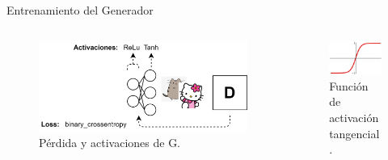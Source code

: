 \begin{frame}{Entrenamiento del Generador}
    \begin{columns}[T]
    \begin{column}{.55\textwidth}
    
    \begin{figure}
        \centering
        \includegraphics[width=\textwidth]{Slides/figures/GAN/Generador Red.png}
        \caption{Pérdida y activaciones de G.}
    \end{figure}
    
    \end{column}
    \hfill
    \begin{column}{.45\textwidth}
    
    \begin{figure}
        \centering
        \includegraphics[width=\textwidth]{Slides/figures/GAN/Tanh.jpg}
        \caption{Función de activación tangencial.}
    \end{figure}
    
    \end{column}
    \end{columns}
    

\end{frame}
